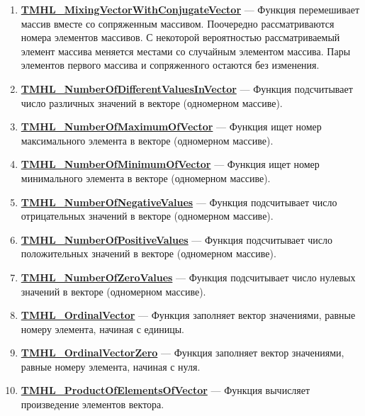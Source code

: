 \documentclass[a4paper,12pt]{article}
\begin{document}
\begin{enumerate}
\item \textbf{\hyperref[TMHL_MixingVectorWithConjugateVector]{TMHL\_MixingVectorWithConjugateVector}} --- Функция перемешивает массив вместе со сопряженным массивом. Поочередно рассматриваются номера элементов массивов. С некоторой вероятностью рассматриваемый элемент массива меняется местами со случайным элементом массива. Пары элементов первого массива и сопряженного остаются без изменения.

\item \textbf{\hyperref[TMHL_NumberOfDifferentValuesInVector]{TMHL\_NumberOfDifferentValuesInVector}} --- Функция подсчитывает число различных значений в векторе (одномерном массиве).

\item \textbf{\hyperref[TMHL_NumberOfMaximumOfVector]{TMHL\_NumberOfMaximumOfVector}} --- Функция ищет номер максимального элемента в векторе (одномерном массиве).

\item \textbf{\hyperref[TMHL_NumberOfMinimumOfVector]{TMHL\_NumberOfMinimumOfVector}} --- Функция ищет номер минимального элемента в векторе (одномерном массиве).

\item \textbf{\hyperref[TMHL_NumberOfNegativeValues]{TMHL\_NumberOfNegativeValues}} --- Функция подсчитывает число отрицательных значений в векторе (одномерном массиве).

\item \textbf{\hyperref[TMHL_NumberOfPositiveValues]{TMHL\_NumberOfPositiveValues}} --- Функция подсчитывает число положительных значений в векторе (одномерном массиве).

\item \textbf{\hyperref[TMHL_NumberOfZeroValues]{TMHL\_NumberOfZeroValues}} --- Функция подсчитывает число нулевых значений в векторе (одномерном массиве).

\item \textbf{\hyperref[TMHL_OrdinalVector]{TMHL\_OrdinalVector}} --- Функция заполняет вектор значениями, равные номеру элемента, начиная с единицы.

\item \textbf{\hyperref[TMHL_OrdinalVectorZero]{TMHL\_OrdinalVectorZero}} --- Функция заполняет вектор значениями, равные номеру элемента, начиная с нуля.

\item \textbf{\hyperref[TMHL_ProductOfElementsOfVector]{TMHL\_ProductOfElementsOfVector}} --- Функция вычисляет произведение элементов вектора.


\end{enumerate}
\end{document}
